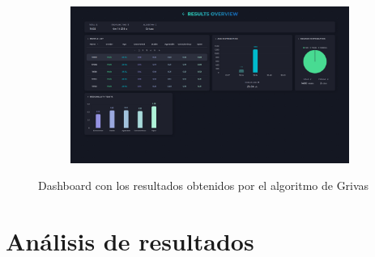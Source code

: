 \begin{figure}[H]
	\centering
	\begin{subfigure}[c]{0.74\textwidth}
			\centering
			\includegraphics[width=\textwidth]{imagenes/dashboard-grivas-500.png}
			\label{fig:casouso_dashboard_grivas_escritorio}
	\end{subfigure}
	\hfill
	\vspace{-1\baselineskip}
	\caption{Dashboard con los resultados obtenidos por el algoritmo de Grivas}
	\label{fig:casouso_dashboard_grivas}
\end{figure}

\section{Análisis de resultados}
